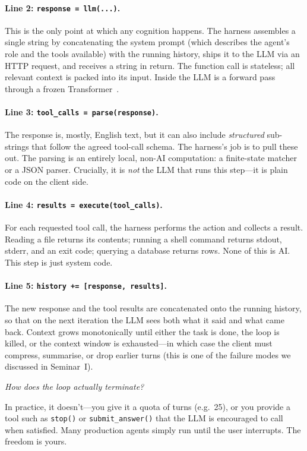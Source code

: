 \paragraph{Line 2: \texttt{response = llm(...)}.}
This is the only point at which any cognition happens.  The
harness assembles a single string by concatenating the system
prompt (which describes the agent's role and the tools available)
with the running history, ships it to the LLM via an HTTP request,
and receives a string in return.  The function call is stateless;
all relevant context is packed into its input.  Inside the LLM is
a forward pass through a frozen Transformer~\cite{vaswani2017attention}.

\paragraph{Line 3: \texttt{tool\_calls = parse(response)}.}
The response is, mostly, English text, but it can also include
\emph{structured} sub-strings that follow the agreed tool-call
schema.  The harness's job is to pull these out.  The parsing
is an entirely local, non-AI computation: a finite-state matcher
or a JSON parser.  Crucially, it is \emph{not} the LLM that runs
this step---it is plain code on the client side.

\paragraph{Line 4: \texttt{results = execute(tool\_calls)}.}
For each requested tool call, the harness performs the action
and collects a result.  Reading a file returns its contents;
running a shell command returns stdout, stderr, and an exit
code; querying a database returns rows.  None of this is AI.
This step is just system code.

\paragraph{Line 5: \texttt{history += [response, results]}.}
The new response and the tool results are concatenated onto
the running history, so that on the next iteration the LLM sees
both what it said and what came back.  Context grows
monotonically until either the task is done, the loop is
killed, or the context window is exhausted---in which case the
client must compress, summarise, or drop earlier turns
(this is one of the failure modes we discussed in
Seminar~I).

\begin{audience}
  \emph{How does the loop actually terminate?}

  In practice, it doesn't---you give it a quota of turns
  (e.g.\ 25), or you provide a tool such as \texttt{stop()} or
  \texttt{submit\_answer()} that the LLM is encouraged to call
  when satisfied.  Many production agents simply run until the
  user interrupts.  The freedom is yours.
\end{audience}

